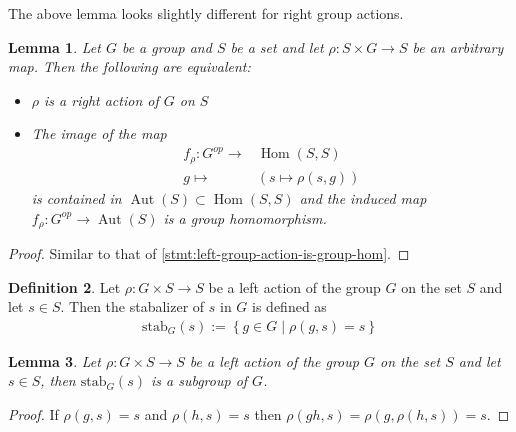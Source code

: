 \documentclass[a4paper,12pt,reqno]{amsart}
\newcommand{\set}[1]{\left\lbrace #1 \right\rbrace}
\newcommand{\stab}[2]{\text{stab}_{#1}(#2)}
\DeclareMathOperator{\Hom}{Hom}
\DeclareMathOperator{\Aut}{Aut}
\newtheorem{lemma}{Lemma}
\theoremstyle{definition}
\newtheorem{definition}[lemma]{Definition}
\numberwithin{lemma}{section}
\numberwithin{equation}{section}
\numberwithin{figure}{section}
\begin{document}
The above lemma looks slightly different for right group actions.
\begin{lemma}\label{stmt:right-group-action-is-oppositie-group-hom}
	Let $G$ be a group and $S$ be a set and let $\rho : S \times G \to S$ be an arbitrary map. Then the following are equivalent:
	\begin{itemize}
		\item $\rho$ is a right action of $G$ on $S$
		\item The image of the map\begin{align*}
		f_\rho : G^{op} \to& \Hom(S,S)\\
		g \mapsto& (s\mapsto \rho(s,g))
		\end{align*} is contained in $\Aut(S) \subset \Hom(S,S)$ and the induced map $f_\rho : G^{op} \to \Aut(S)$ is a group homomorphism.
	\end{itemize}
\end{lemma}
\begin{proof}
	Similar to that of \cref{stmt:left-group-action-is-group-hom}.
\end{proof}

\begin{definition}\label{def:stabilizer}
Let $\rho:  G \times S \to S$ be a left action of the group $G$ on the set $S$ and let $s \in S$. Then the stabalizer of $s$ in  $G$ is defined as \begin{align*}
\stab{G}{s} := \set{ g \in G \mid \rho(g,s)=s}
\end{align*}
\end{definition}
\begin{lemma}
Let $\rho: G \times S \to S$ be a left action of the group $G$ on the set $S$ and let $s \in S$, then $\stab{G}{s}$ is a subgroup of $G$.
\end{lemma}
\begin{proof}
If $\rho(g,s)=s$ and $\rho(h,s)=s$ then $\rho(gh,s)=\rho(g,\rho(h,s))=s$.
\end{proof}
\end{document}
